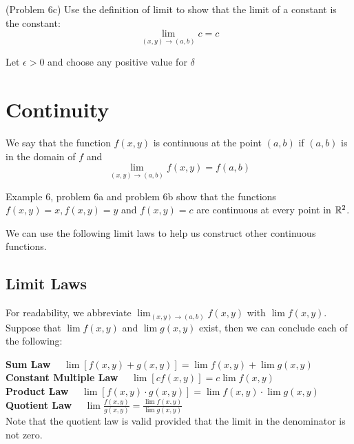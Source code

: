 \documentclass[handout]{ximera}
\begin{document}
\begin{problem}(Problem 6c)
Use the definition of limit to show that the limit of a constant is the constant:
\[
\lim_{(x,y) \to (a,b)} c = c
\]
\begin{hint}
Let $\epsilon >0$ and choose any positive value for $\delta$
\end{hint}
\end{problem}


\section{Continuity}

\begin{definition}[Continuity]
We say that the function $f(x,y)$ is continuous at the point $(a,b)$ if $(a,b)$ is in the domain of $f$ and 
\[
\lim_{(x,y) \to (a,b)} f(x,y) = f(a,b)
\]
\end{definition}

Example 6, problem 6a and problem 6b show that the functions $f(x,y) = x, f(x,y) = y$ and $f(x,y) = c$ are continuous at every point in $\mathbb R^2$.

We can use the following limit laws to help us construct other continuous functions.

\subsection{Limit Laws}
For readability, we abbreviate $\lim_{(x,y) \to (a,b)} f(x,y)$ with $\lim f(x,y)$.\\
Suppose that $\lim f(x,y)$ and $\lim g(x,y)$ exist, then we can conclude each of the following:

\textbf{Sum Law} $\quad \displaystyle  \lim [f(x,y) + g(x,y)] = \lim f(x,y) +\lim g(x,y) $\\

\textbf{Constant Multiple Law} $\quad \displaystyle \lim[cf(x,y) ] = c\lim f(x,y) $\\

\textbf{Product Law} $\quad \displaystyle \lim[f(x,y) \cdot g(x,y)] = \lim f(x,y) \cdot \lim g(x,y)$\\ 
 
\textbf{Quotient Law} $\quad \displaystyle \lim \frac{f(x,y)}{g(x,y)} = \frac{\lim f(x,y)}{\lim g(x,y)} $\\

Note that the quotient law is valid provided that the limit in the denominator is not zero.
\end{document}

